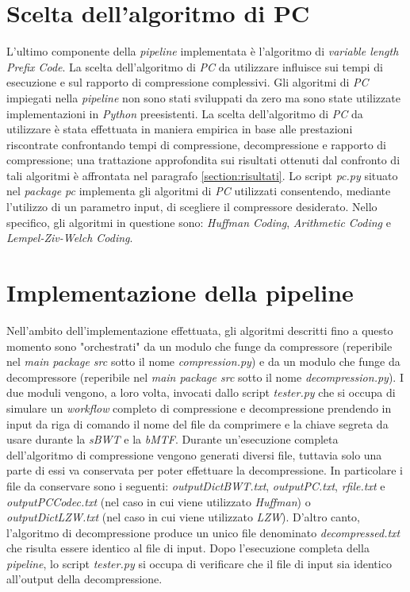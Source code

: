 \section{Scelta dell'algoritmo di PC} 
L'ultimo componente della \emph{pipeline} implementata è l'algoritmo di \emph{variable length Prefix Code}. La scelta dell'algoritmo di \emph{PC} da utilizzare influisce sui tempi di esecuzione e sul rapporto di compressione complessivi. Gli algoritmi di \emph{PC} impiegati nella \emph{pipeline} non sono stati sviluppati da zero ma sono state utilizzate implementazioni in \emph{Python} preesistenti. La scelta dell'algoritmo di \emph{PC} da utilizzare è stata effettuata in maniera empirica in base alle prestazioni riscontrate confrontando tempi di compressione, decompressione e rapporto di compressione; una trattazione approfondita sui risultati ottenuti dal confronto di tali algoritmi è affrontata nel paragrafo \ref{section:risultati}. Lo script \emph{pc.py} situato nel \emph{package pc} implementa gli algoritmi di \emph{PC} utilizzati consentendo, mediante l'utilizzo di un parametro input, di scegliere il compressore desiderato. Nello specifico, gli algoritmi in questione sono: \emph{Huffman Coding}, \emph{Arithmetic Coding} e \emph{Lempel-Ziv-Welch Coding}.
\section{Implementazione della pipeline}
Nell'ambito dell'implementazione effettuata, gli algoritmi descritti fino a questo momento sono "orchestrati" da un modulo che funge da compressore (reperibile nel \emph{main package src} sotto il nome \emph{compression.py}) e da un modulo che funge da decompressore (reperibile nel \emph{main package src} sotto il nome \emph{decompression.py}). I due moduli vengono, a loro volta, invocati dallo script \emph{tester.py} che si occupa di simulare un \emph{workflow} completo di compressione e decompressione prendendo in input da riga di comando il nome del file da comprimere e la chiave segreta da usare durante la \emph{sBWT} e la \emph{bMTF}. Durante un'esecuzione completa dell'algoritmo di compressione vengono generati diversi file, tuttavia solo una parte di essi va conservata per poter effettuare la decompressione. In particolare i file da conservare sono i seguenti: \emph{outputDictBWT.txt}, \emph{outputPC.txt}, \emph{rfile.txt} e \emph{outputPCCodec.txt} (nel caso in cui viene utilizzato \emph{Huffman}) o \emph{outputDictLZW.txt} (nel caso in cui viene utilizzato \emph{LZW}). D'altro canto, l'algoritmo di decompressione produce un unico file denominato \emph{decompressed.txt} che risulta essere identico al file di input. Dopo l'esecuzione completa della \emph{pipeline}, lo script \emph{tester.py} si occupa di verificare che il file di input sia identico all'output della decompressione.